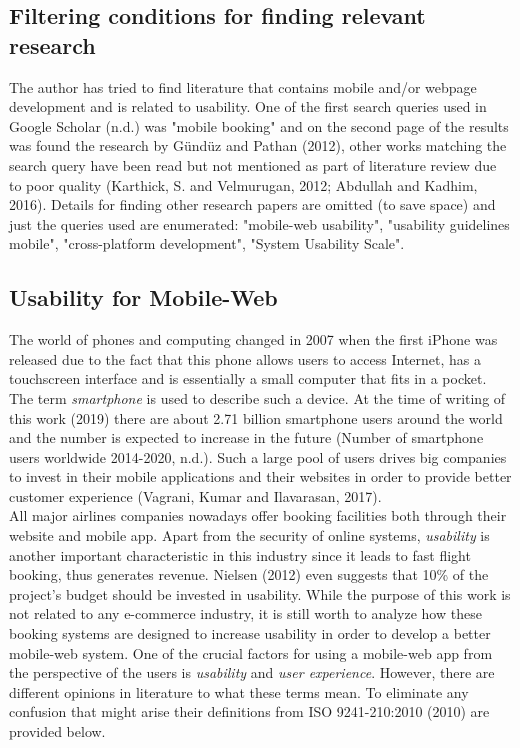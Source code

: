 \documentclass[version=last,fontsize=13pt]{scrartcl}
\begin{document}

\subsection{Filtering conditions for finding relevant research}
	The author has tried to find literature that contains  mobile and/or webpage development and is related to usability. One of the first search queries used in Google Scholar (n.d.) was "mobile booking" and on the second page of the results was found the research by Gündüz and Pathan (2012), other works matching the search query have been read but not mentioned as part of literature review due to poor quality (Karthick, S. and Velmurugan, 2012; Abdullah and Kadhim, 2016). Details for finding other research papers are omitted (to save space) and just the queries used are enumerated:  "mobile-web usability", "usability guidelines mobile", "cross-platform development", "System Usability Scale".

\subsection{Usability for Mobile-Web}

\indent
	The world of phones and computing changed in 2007 when the first iPhone was released due to the fact that this phone allows users to access Internet, has a touchscreen interface and is essentially a small computer that fits in a pocket. The term \textit{smartphone} is used to describe such a device. At the time of writing of this work (2019) there are about 2.71 billion smartphone users around the world and the number is expected to increase in the future (Number of smartphone users worldwide 2014-2020, n.d.). Such a large pool of users drives big companies to invest in their mobile applications and their websites in order to provide better customer experience (Vagrani, Kumar and Ilavarasan, 2017).\\ 
	All major airlines companies nowadays offer booking facilities both through their website and mobile app. Apart from the security of online systems, \textit{usability} is another important characteristic in this industry since it leads to fast flight booking, thus generates revenue. Nielsen (2012) even suggests that 10\% of  the project's budget should be invested in usability. While the purpose of this work is not related to any e-commerce industry, it is still worth to analyze how these booking systems are designed to increase usability in  order to develop a better mobile-web system. One of the crucial factors for using a mobile-web app from the perspective of the users is \textit{usability} and \textit{user experience}. However, there are different opinions in literature to what these terms mean. To eliminate any confusion that might arise their definitions from ISO 9241-210:2010 (2010) are provided below.
\end{document}
